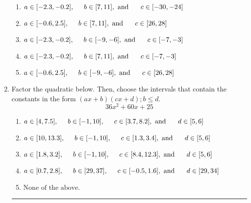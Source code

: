 \documentclass[14pt]{extbook}
\newcommand{\litem}[1]{\item#1\hspace*{-1cm}\rule{\textwidth}{0.4pt}}
\begin{document}
\begin{enumerate}
{\begin{center}
\end{center}
\begin{enumerate}[label=\Alph*.]
\item \( a \in [-2.3, -0.2], \hspace*{5mm} b \in [7, 11], \text{ and } \hspace*{5mm} c \in [-30, -24] \)
\item \( a \in [-0.6, 2.5], \hspace*{5mm} b \in [7, 11], \text{ and } \hspace*{5mm} c \in [26, 28] \)
\item \( a \in [-2.3, -0.2], \hspace*{5mm} b \in [-9, -6], \text{ and } \hspace*{5mm} c \in [-7, -3] \)
\item \( a \in [-2.3, -0.2], \hspace*{5mm} b \in [7, 11], \text{ and } \hspace*{5mm} c \in [-7, -3] \)
\item \( a \in [-0.6, 2.5], \hspace*{5mm} b \in [-9, -6], \text{ and } \hspace*{5mm} c \in [26, 28] \)

\end{enumerate} }
\litem{
Factor the quadratic below. Then, choose the intervals that contain the constants in the form $(ax+b)(cx+d); b \leq d.$\[ 36x^{2} +60 x + 25 \]\begin{enumerate}[label=\Alph*.]
\item \( a \in [4, 7.5], \hspace*{5mm} b \in [-1, 10], \hspace*{5mm} c \in [3.7, 8.2], \text{ and } \hspace*{5mm} d \in [5, 6] \)
\item \( a \in [10, 13.3], \hspace*{5mm} b \in [-1, 10], \hspace*{5mm} c \in [1.3, 3.4], \text{ and } \hspace*{5mm} d \in [5, 6] \)
\item \( a \in [1.8, 3.2], \hspace*{5mm} b \in [-1, 10], \hspace*{5mm} c \in [8.4, 12.3], \text{ and } \hspace*{5mm} d \in [5, 6] \)
\item \( a \in [0.7, 2.8], \hspace*{5mm} b \in [29, 37], \hspace*{5mm} c \in [-0.5, 1.6], \text{ and } \hspace*{5mm} d \in [29, 34] \)
\item \( \text{None of the above.} \)


\end{enumerate}}
\end{enumerate}
\end{document}
